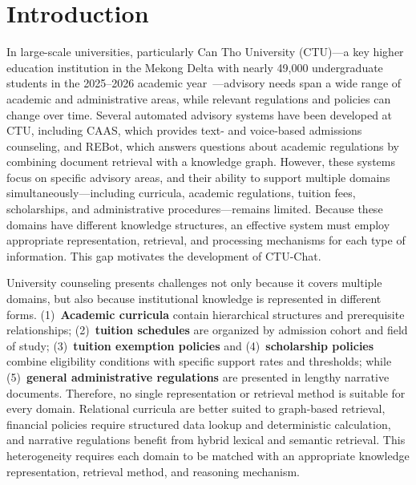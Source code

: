 \section{Introduction}
\label{sec:intro}

In large-scale universities, particularly Can Tho University (CTU)—a key higher education institution in the Mekong Delta with nearly 49,000 undergraduate students in the 2025--2026 academic year~\cite{ctu2022handbook}—advisory needs span a wide range of academic and administrative areas, while relevant regulations and policies can change over time. Several automated advisory systems have been developed at CTU, including CAAS, which provides text- and voice-based admissions counseling, and REBot, which answers questions about academic regulations by combining document retrieval with a knowledge graph. However, these systems focus on specific advisory areas, and their ability to support multiple domains simultaneously—including curricula, academic regulations, tuition fees, scholarships, and administrative procedures—remains limited. Because these domains have different knowledge structures, an effective system must employ appropriate representation, retrieval, and processing mechanisms for each type of information. This gap motivates the development of CTU-Chat.

University counseling presents challenges not only because it covers multiple domains, but also because institutional knowledge is represented in different forms. (1)~\textbf{Academic curricula} contain hierarchical structures and prerequisite relationships; (2)~\textbf{tuition schedules} are organized by admission cohort and field of study; (3)~\textbf{tuition exemption policies} and (4)~\textbf{scholarship policies} combine eligibility conditions with specific support rates and thresholds; while (5)~\textbf{general administrative regulations} are presented in lengthy narrative documents. Therefore, no single representation or retrieval method is suitable for every domain. Relational curricula are better suited to graph-based retrieval, financial policies require structured data lookup and deterministic calculation, and narrative regulations benefit from hybrid lexical and semantic retrieval. This heterogeneity requires each domain to be matched with an appropriate knowledge representation, retrieval method, and reasoning mechanism.

